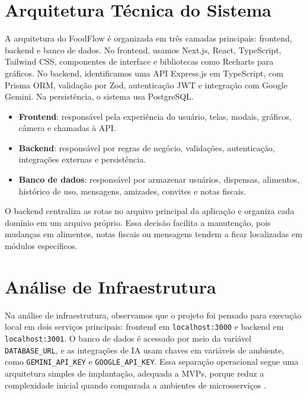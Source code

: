 \documentclass[12pt]{article}
\begin{document}
\section{Arquitetura Técnica do Sistema}

A arquitetura do FoodFlow é organizada em três camadas principais: frontend, backend e banco de dados. No frontend, usamos Next.js, React, TypeScript, Tailwind CSS, componentes de interface e bibliotecas como Recharts para gráficos. No backend, identificamos uma API Express.js em TypeScript, com Prisma ORM, validação por Zod, autenticação JWT e integração com Google Gemini. Na persistência, o sistema usa PostgreSQL.

\begin{itemize}
    \item \textbf{Frontend}: responsável pela experiência do usuário, telas, modais, gráficos, câmera e chamadas à API.
    \item \textbf{Backend}: responsável por regras de negócio, validações, autenticação, integrações externas e persistência.
    \item \textbf{Banco de dados}: responsável por armazenar usuários, dispensas, alimentos, histórico de uso, mensagens, amizades, convites e notas fiscais.
\end{itemize}

O backend centraliza as rotas no arquivo principal da aplicação e organiza cada domínio em um arquivo próprio. Essa decisão facilita a manutenção, pois mudanças em alimentos, notas fiscais ou mensagens tendem a ficar localizadas em módulos específicos.

\section{Análise de Infraestrutura}

Na análise de infraestrutura, observamos que o projeto foi pensado para execução local em dois serviços principais: frontend em \texttt{localhost:3000} e backend em \texttt{localhost:3001}. O banco de dados é acessado por meio da variável \texttt{DATABASE\_URL}, e as integrações de IA usam chaves em variáveis de ambiente, como \texttt{GEMINI\_API\_KEY} e \texttt{GOOGLE\_API\_KEY}. Essa separação operacional segue uma arquitetura simples de implantação, adequada a MVPs, porque reduz a complexidade inicial quando comparada a ambientes de microsserviços \cite{blinowski2022}.
\end{document}
